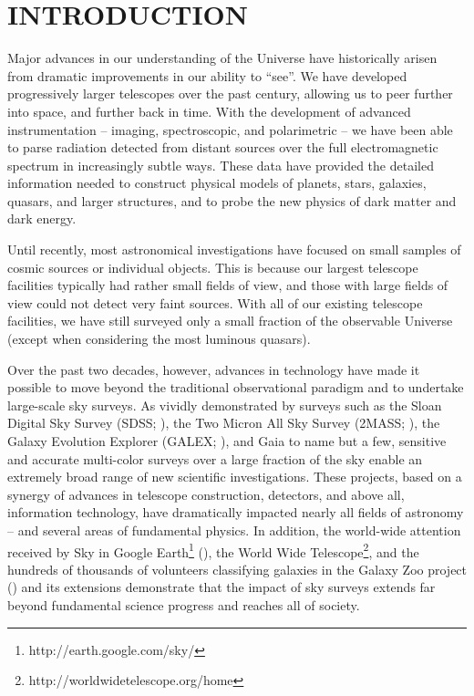 \section{  INTRODUCTION}

Major advances in our understanding of the Universe have historically arisen
from dramatic improvements in our ability to ``see''. We have developed
progressively larger telescopes over the past century, allowing us
to peer further into space, and further back in time. With the development of
advanced instrumentation -- imaging, spectroscopic, and polarimetric -- we
have been able to parse radiation detected from distant sources over the
full electromagnetic spectrum in increasingly subtle ways.
These data have provided the detailed information needed to construct physical
models of planets, stars, galaxies, quasars, and larger structures, and to probe the
new physics of dark matter and dark energy.

Until recently, most astronomical investigations have focused on small samples
of cosmic sources or individual objects. This is because our largest telescope
facilities typically had rather small fields of view, and those with large
fields of view could not detect very faint sources. With all of our existing
telescope facilities, we have still surveyed only a small fraction of the
observable Universe (except when considering the most luminous quasars).

Over the past two decades, however, advances in technology have made it possible to
move beyond the traditional observational paradigm and to undertake large-scale
sky surveys. As vividly demonstrated by surveys such as the Sloan Digital Sky
Survey (SDSS; \cite{2000AJ....120.1579Y}), the Two Micron All Sky Survey (2MASS; \cite{2006AJ....131.1163S}),
the Galaxy Evolution Explorer (GALEX; \cite{2005ApJ...619L...1M}),
and Gaia \cite{2016A&A...595A...2G} to name but a few, sensitive and accurate
multi-color surveys over a large fraction of the sky enable an extremely broad range of
new scientific investigations. These projects, based on a synergy of advances in
telescope construction, detectors, and above all, information technology,
have dramatically impacted nearly all fields of astronomy
-- and several areas of fundamental physics. In addition, the world-wide attention
received by Sky in Google Earth\footnote{http://earth.google.com/sky/}
(\cite{2007arXiv0709.0752S}), the World Wide Telescope\footnote{http://worldwidetelescope.org/home},
and the hundreds of thousands of volunteers
classifying galaxies in the Galaxy Zoo project (\cite{2011MNRAS.410..166L})
and its extensions demonstrate that the impact of sky surveys extends
far beyond fundamental science progress and reaches all of society.

